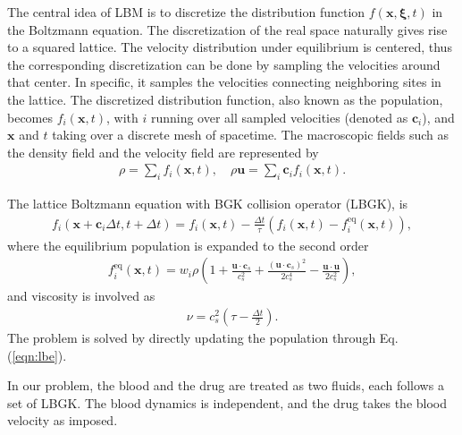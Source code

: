 The central idea of LBM is to discretize the distribution function $f(\mathbf{x},\mathbf{\xi}, t)$ in the Boltzmann equation. The discretization of the real space naturally gives rise to a squared lattice. The velocity distribution under equilibrium is centered, thus the corresponding discretization can be done by sampling the velocities around that center. In specific, it samples the velocities connecting neighboring sites in the lattice. The discretized  distribution function, also known as the population, becomes $f_i(\mathbf{x}, t)$, with $i$ running over all sampled velocities (denoted as $\mathbf{c}_i$), and $\mathbf{x}$ and $t$ taking over a discrete mesh of spacetime. The macroscopic fields such as the density field and the velocity field are represented by
\begin{align}
    \rho=\sum_if_i(\mathbf{x},t),\quad
    \rho\mathbf{u}=\sum_i\mathbf{c}_if_i(\mathbf{x},t).
\end{align}

The lattice Boltzmann equation with BGK collision operator (LBGK), is
\begin{align}
    f_i(\mathbf{x}+\mathbf{c}_i\Delta t, t+\Delta t)
        =f_i(\mathbf{x}, t)-\frac{\Delta t}{\tau}
         \left(f_i(\mathbf{x}, t) - f_i^\mathrm{eq}(\mathbf{x}, t)\right),
    \label{eqn:lbe}
\end{align}
where the equilibrium population is expanded to the second order
\begin{align}
    f_i^\mathrm{eq}(\mathbf{x}, t)=w_i\rho\left(
        1+\frac{\mathbf{u}\cdot\mathbf{c}_s}{c_s^2}
        +\frac{(\mathbf{u}\cdot\mathbf{c}_s)^2}{2c_s^4}
        -\frac{\mathbf{u}\cdot\mathbf{u}}{2c_s^2}
        \right), 
\end{align}
and viscosity is involved as
\begin{align}
    \nu=c_s^2(\tau-\frac{\Delta t}{2}).
\end{align}
The problem is solved by directly updating the population through Eq. (\ref{eqn:lbe}). 

In our problem, the blood and the drug are treated as two  fluids, each follows a set of LBGK. The blood dynamics is independent, and the drug takes the blood velocity as imposed.
